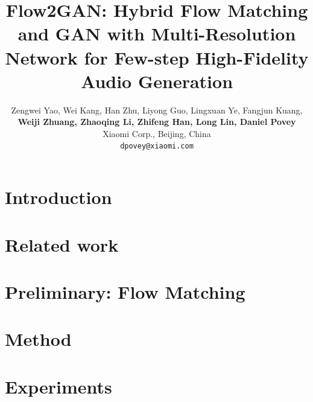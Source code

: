 \documentclass{article} %
\title{Flow2GAN: Hybrid Flow Matching and GAN with Multi-Resolution Network for Few-step High-Fidelity Audio Generation}
\author{Zengwei Yao, Wei Kang, Han Zhu, Liyong Guo, Lingxuan Ye, Fangjun Kuang, \\
\textbf{Weiji Zhuang, Zhaoqing Li, Zhifeng Han, Long Lin, Daniel Povey}\\
Xiaomi Corp., Beijing, China \\
\texttt{dpovey@xiaomi.com} \\
}
\begin{document}
\maketitle

\begin{abstract}

\end{abstract}

\vspace{-1em}
\section{Introduction}
\vspace{-0.8em}


\vspace{-1em}
\section{Related work}
\vspace{-0.9em}


\vspace{-1em}
\section{Preliminary: Flow Matching}
\vspace{-0.8em}


\vspace{-0.8em}
\section{Method}
\vspace{-0.8em}


\vspace{-0.6em}
\section{Experiments}
\vspace{-0.8em}


\vspace{-1em}
\end{document}
